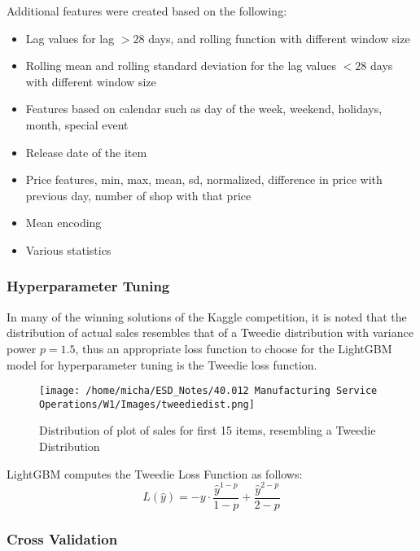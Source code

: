 \documentclass[12pt]{article}
\begin{document}
Additional features were created based on the following: \begin{itemize}
    \item Lag values for lag $> 28$ days, and rolling function with different window size
    \item Rolling mean and rolling standard deviation for the lag values $< 28$ days with different window size
    \item Features based on calendar such as day of the week, weekend, holidays, month, special event 
    \item Release date of the item
    \item Price features, min, max, mean, sd, normalized, difference in price with previous day, number of shop with that price
    \item Mean encoding
    \item Various statistics
\end{itemize}

\subsubsection*{Hyperparameter Tuning}

In many of the winning solutions of the Kaggle competition, it is noted that the distribution of actual sales resembles that of a Tweedie distribution with variance power $p =1.5$, thus an appropriate loss function to choose for the LightGBM model for hyperparameter tuning is the Tweedie loss function. 

\begin{figure}[H]
    \centering
    \texttt{[image: /home/micha/ESD\_Notes/40.012 Manufacturing Service Operations/W1/Images/tweediedist.png]}
    \caption{Distribution of plot of sales for first 15 items, resembling a Tweedie Distribution}
    \label{fig:6-tweedie}
\end{figure} 

\noindent LightGBM computes the Tweedie Loss Function as follows: \begin{equation}
    L(\hat{y}) = -y \cdot \frac{\hat{y}^{1-p}}{1-p} + \frac{\hat{y}^{2-p}}{2-p}
\end{equation}

\subsubsection*{Cross Validation}
\end{document}
